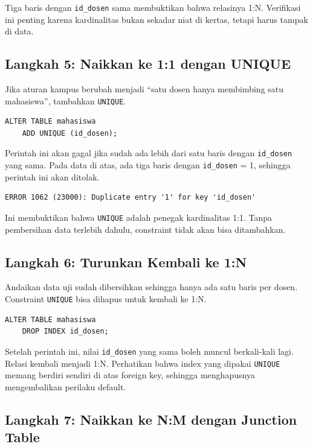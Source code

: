 \documentclass[11pt,a4paper]{article}
\begin{document}
Tiga baris dengan \texttt{id\_dosen} sama membuktikan bahwa relasinya 1:N. Verifikasi ini penting karena kardinalitas bukan sekadar niat di kertas, tetapi harus tampak di data.

\subsection{Langkah 5: Naikkan ke 1:1 dengan UNIQUE}

Jika aturan kampus berubah menjadi ``satu dosen hanya membimbing satu mahasiswa'', tambahkan \texttt{UNIQUE}.

\begin{lstlisting}[style=code]
ALTER TABLE mahasiswa
    ADD UNIQUE (id_dosen);
\end{lstlisting}

Perintah ini akan gagal jika sudah ada lebih dari satu baris dengan \texttt{id\_dosen} yang sama. Pada data di atas, ada tiga baris dengan \texttt{id\_dosen} = 1, sehingga perintah ini akan ditolak.

\begin{lstlisting}[style=out]
ERROR 1062 (23000): Duplicate entry '1' for key 'id_dosen'
\end{lstlisting}

Ini membuktikan bahwa \texttt{UNIQUE} adalah penegak kardinalitas 1:1. Tanpa pembersihan data terlebih dahulu, constraint tidak akan bisa ditambahkan.

\subsection{Langkah 6: Turunkan Kembali ke 1:N}

Andaikan data uji sudah dibersihkan sehingga hanya ada satu baris per dosen. Constraint \texttt{UNIQUE} bisa dihapus untuk kembali ke 1:N.

\begin{lstlisting}[style=code]
ALTER TABLE mahasiswa
    DROP INDEX id_dosen;
\end{lstlisting}

Setelah perintah ini, nilai \texttt{id\_dosen} yang sama boleh muncul berkali-kali lagi. Relasi kembali menjadi 1:N. Perhatikan bahwa index yang dipakai \texttt{UNIQUE} memang berdiri sendiri di atas foreign key, sehingga menghapusnya mengembalikan perilaku default.

\subsection{Langkah 7: Naikkan ke N:M dengan Junction Table}
\end{document}
